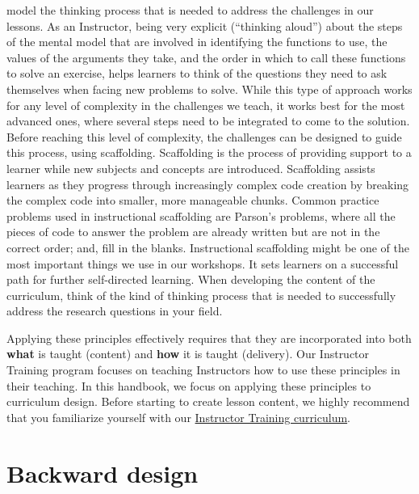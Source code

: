 \documentclass[
]{book}
\begin{document}
\begin{enumerate}
  model the thinking process that is needed to address the challenges
  in our lessons. As an Instructor, being very explicit (``thinking
  aloud'') about the steps of the mental model that are involved in identifying
  the functions to use, the values of the arguments they take, and the order in
  which to call these functions to solve an exercise, helps learners to think
  of the questions they need to ask themselves when facing new problems to
  solve. While this type of approach works for any level of complexity in the
  challenges we teach, it works best for the most advanced ones, where several steps
  need to be integrated to come to the solution. Before reaching this level of
  complexity, the challenges can be designed to guide this process, using
  scaffolding. Scaffolding is the process of providing support to a learner while
  new subjects and concepts are introduced. Scaffolding assists learners as they
  progress through increasingly complex code creation by breaking the complex code
  into smaller, more manageable chunks. Common practice problems used in instructional
  scaffolding are Parson's problems, where all the pieces of code to answer the problem
  are already written but are not in the correct order; and, fill in the blanks.
  Instructional scaffolding might be one of the most important
  things we use in our workshops. It sets learners on a successful path
  for further self-directed learning. When developing the content of the curriculum, think of the
  kind of thinking process that is needed to successfully address the research
  questions in your field.
\end{enumerate}

Applying these principles effectively requires that they are incorporated into both
\textbf{what} is taught (content) and \textbf{how} it is taught (delivery). Our
Instructor Training program focuses on teaching Instructors how to use these principles
in their teaching. In this handbook, we focus on applying these principles to
curriculum design. Before starting to create lesson content, we highly recommend that you familiarize yourself with our \href{https://carpentries.github.io/instructor-training/}{Instructor Training curriculum}.

\hypertarget{backward-design}{%
\section{Backward design}\label{backward-design}}
\end{document}
